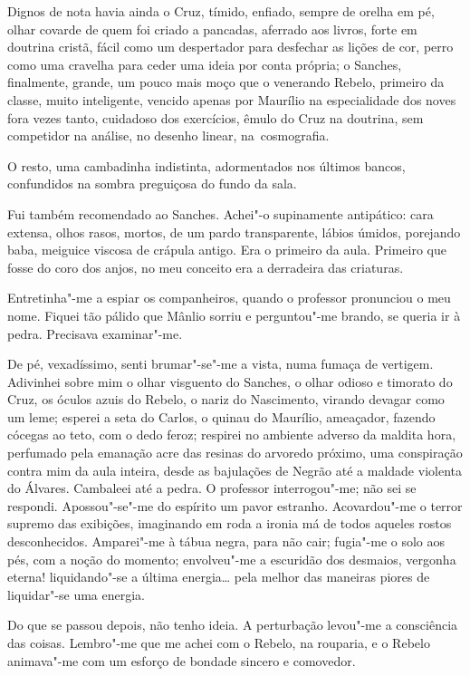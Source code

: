 Dignos de nota havia ainda o Cruz, tímido, enfiado, sempre de orelha em
pé, olhar covarde de quem foi criado a pancadas, aferrado aos livros,
forte em doutrina cristã, fácil como um despertador para desfechar as
lições de cor, perro como uma cravelha para ceder uma ideia por conta
própria; o Sanches, finalmente, grande, um pouco mais moço que o
venerando Rebelo, primeiro da classe, muito inteligente, vencido apenas
por Maurílio na especialidade dos noves fora vezes tanto, cuidadoso dos
exercícios, êmulo do Cruz na doutrina, sem competidor na análise, no
desenho linear, \mbox{na cosmografia.} 

O resto, uma cambadinha indistinta,
adormentados nos últimos bancos, confundidos na sombra preguiçosa do
fundo da sala. 

Fui também recomendado ao Sanches. Achei"-o supinamente
antipático: cara extensa, olhos rasos, mortos, de um pardo
transparente, lábios úmidos, porejando baba, meiguice viscosa de
crápula antigo. Era o primeiro da aula. Primeiro que fosse do coro dos
anjos, no meu conceito era a derradeira das criaturas. 

Entretinha"-me a espiar os companheiros, quando o professor pronunciou o meu nome.
Fiquei tão pálido que Mânlio sorriu e perguntou"-me brando, se queria
ir à pedra. Precisava examinar"-me. 


De pé, vexadíssimo, senti
brumar"-se"-me a vista, numa fumaça de vertigem. Adivinhei sobre mim
o olhar visguento do Sanches, o olhar odioso e timorato do Cruz, os
óculos azuis do Rebelo, o nariz do Nascimento, virando devagar como um leme; 
esperei a seta do Carlos, o
quinau do Maurílio, ameaçador, fazendo cócegas ao teto, com o dedo
feroz; respirei no ambiente adverso da maldita hora, perfumado pela
emanação acre das resinas do arvoredo próximo, uma conspiração contra
mim da aula inteira, desde as bajulações de Negrão até a maldade
violenta do Álvares. Cambaleei até a pedra. O professor
interrogou"-me; não sei se respondi. Apossou"-se"-me do espírito um
pavor estranho. Acovardou"-me o terror supremo das exibições,
imaginando em roda a ironia má de todos aqueles rostos desconhecidos.
Amparei"-me à tábua negra, para não cair; fugia"-me o solo aos pés,
com a noção do momento; envolveu"-me a escuridão dos desmaios,
vergonha eterna! liquidando"-se a última energia\ldots{} pela melhor das
maneiras piores de liquidar"-se uma energia.

Do que se passou depois,
não tenho ideia. A perturbação levou"-me a consciência das coisas.
Lembro"-me que me achei com o Rebelo, na rouparia, e o Rebelo
animava"-me com um esforço de bondade sincero e comovedor. 


